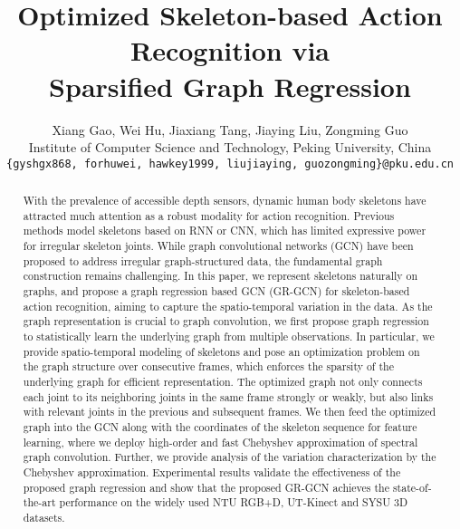 \documentclass[conference]{IEEEtran}
\begin{document}
\title{Optimized Skeleton-based Action Recognition via \\ Sparsified Graph Regression}

\author{Xiang Gao, Wei Hu, Jiaxiang Tang, Jiaying Liu, Zongming Guo\\
Institute of Computer Science and Technology, Peking University, China\\
{\tt\small \{gyshgx868, forhuwei, hawkey1999, liujiaying, guozongming\}@pku.edu.cn}
}

\maketitle

\begin{abstract}
   With the prevalence of accessible depth sensors, dynamic human body skeletons have attracted much attention as a robust modality for action recognition. Previous methods model skeletons based on RNN or CNN, which has limited expressive power for irregular skeleton joints. While graph convolutional networks (GCN) have been proposed to address irregular graph-structured data, the fundamental graph construction remains challenging. In this paper, we represent skeletons naturally on graphs, and propose a graph regression based GCN (GR-GCN) for skeleton-based action recognition, aiming to capture the spatio-temporal variation in the data. As the graph representation is crucial to graph convolution, we first propose graph regression to statistically learn the underlying graph from multiple observations. In particular, we provide spatio-temporal modeling of skeletons and pose an optimization problem on the graph structure over consecutive frames, which enforces the sparsity of the underlying graph for efficient representation. The optimized graph not only connects each joint to its neighboring joints in the same frame strongly or weakly, but also links with relevant joints in the previous and subsequent frames. We then feed the optimized graph into the GCN along with the coordinates of the skeleton sequence for feature learning, where we deploy high-order and fast Chebyshev approximation of spectral graph convolution. Further, we provide analysis of the variation characterization by the Chebyshev approximation. Experimental results validate the effectiveness of the proposed graph regression and show that the proposed GR-GCN achieves the state-of-the-art performance on the widely used NTU RGB+D, UT-Kinect and SYSU 3D datasets.
\end{abstract}
\end{document}

